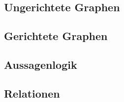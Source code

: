 \documentclass[10pt,a4paper]{article}
\begin{document}
\subsection{Ungerichtete Graphen}



\subsection{Gerichtete Graphen}



\subsection{Aussagenlogik}



\subsection{Relationen}
\end{document}
